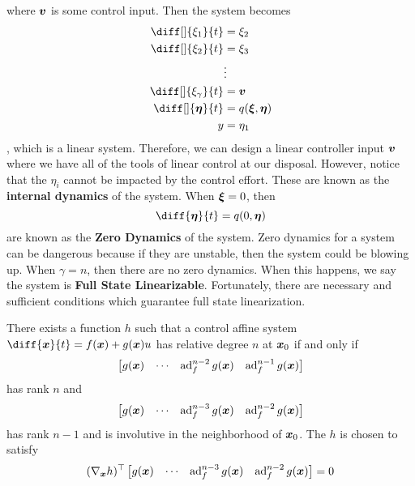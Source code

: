 where $\boldsymbol{v}$ is some control input. Then the system becomes
\[
	\begin{aligned}
		\diff[]{\xi_1}{t} &= \xi_2\\
		\diff[]{\xi_2}{t} &= \xi_3\\
		&\vdots\\
		\diff[]{\xi_{\gamma}}{t} &= \bs{v}\\
		\diff[]{\bs{\eta}}{t} &= q(\bs{\xi}, \bs{\eta})\\
		y &= \eta_1
	\end{aligned}
\],
which is a linear system. Therefore, we can design a linear controller input $\boldsymbol{v}$
where we have all of the tools of linear control at our disposal. However,
notice that the $\eta_i$ cannot be impacted by the control effort. These are
known as the \textbf{internal dynamics} of the system. When $\boldsymbol{\xi} = 0$,
then \[
	\diff{\bs{\eta}}{t} = q(0, \bs{\eta})
\]
are known as the \textbf{Zero Dynamics} of the system. Zero dynamics for a
system can be dangerous because if they are unstable, then the system could be
blowing up. When $\gamma = n$, then there are no zero dynamics. When this
happens, we say the system is \textbf{Full State Linearizable}. Fortunately,
there are necessary and sufficient conditions which guarantee full state
linearization.
\begin{theorem}
	There exists a function $h$ such that a control affine system
	$\diff{\bs{x}}{t} = f(\bs{x}) + g(\bs{x})u$ has relative degree $n$ at
	$\boldsymbol{x}_0$ if and only if \[
		\begin{bmatrix}
			g(\boldsymbol{x}) & \cdots & \operatorname*{ad}_f^{n-2}g(\boldsymbol{x}) & \operatorname*{ad}_f^{n-1}g(\boldsymbol{x})
		\end{bmatrix}
	\]
	has rank $n$ and \[
		\begin{bmatrix}
			g(\boldsymbol{x}) & \cdots & \operatorname*{ad}_f^{n-3}g(\boldsymbol{x}) & \operatorname*{ad}_f^{n-2}g(\boldsymbol{x})
		\end{bmatrix}
	\]
	has rank $n-1$ and is involutive in the neighborhood of $\boldsymbol{x}_0$. The $h$ is
	chosen to satisfy \[
		(\nabla_{\boldsymbol{x}}h)^\top \begin{bmatrix}
			g(\boldsymbol{x}) & \cdots & \operatorname*{ad}_f^{n-3}g(\boldsymbol{x}) & \operatorname*{ad}_f^{n-2}g(\boldsymbol{x})
		\end{bmatrix} = 0
	\]
	\label{thm:full-state-linearization}
\end{theorem}
